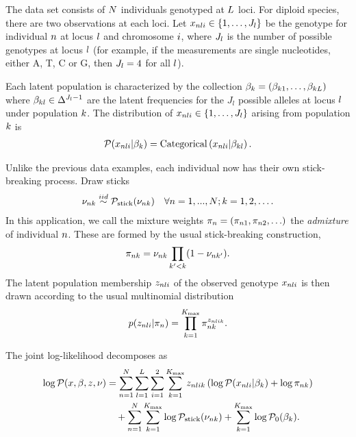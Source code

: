 \begin{ex}

The data set consists of $N$ individuals genotyped at $L$ loci.
For diploid species, there are two observations at each loci.
Let $x_{nli}\in\{1, \ldots, J_l\}$ be the genotype for individual $n$ at locus $l$ and chromosome $i$,
where $J_l$ is the number of possible genotypes at locus $l$
(for example, if the measurements are single nucleotides, either A, T, C or G,
then $J_l = 4$ for all $l$).

Each latent population is characterized by the collection
$\beta_k = (\beta_{k1}, \ldots, \beta_{kL})$ where
$\beta_{kl}\in\Delta^{J_l - 1}$ are the latent frequencies for the $J_l$
possible alleles at locus $l$ under population $k$.
The distribution of $x_{nli}\in\{1, \ldots, J_l\}$ arising from population $k$ is
\begin{align*}
\mathcal{P}(x_{nli} \vert \beta_{k}) =
\mathrm{Categorical}\left(x_{nli}\vert \beta_{kl}\right).
\end{align*}


Unlike the previous data examples, each individual now has their own stick-breaking process. Draw sticks
\begin{align*}
\nu_{nk} \overset{iid}{\sim} \mathcal{P}_{\mathrm{stick}}(\nu_{nk}) \quad \forall n = 1, ..., N; k = 1, 2, \ldots.
\end{align*}
In this application,
we call the mixture weights
$\pi_{n} = (\pi_{n1}, \pi_{n2}, \ldots)$ the
\textit{admixture} of individual $n$.
These are formed by the usual stick-breaking construction,
\begin{align*}
\pi_{nk} = \nu_{nk} \prod_{k' < k} (1 - \nu_{nk'}).
\end{align*}
%
The latent population membership $z_{nli}$ of the observed genotype
$x_{nli}$ is then drawn according to the usual multinomial distribution
\begin{align*}
p(z_{nli} | \pi_n) = \prod_{k=1}^{{K_{\mathrm{max}}}} \pi_{nk}^{z_{nlik}}.
\end{align*}

The joint log-likelihood decomposes as
\begin{align*}
\log \mathcal{P}(x, \beta, z, \nu) &=
\sum_{n=1}^N \sum_{l=1}^L \sum_{i = 1}^2 \sum_{k=1}^{{K_{\mathrm{max}}}}
        z_{nlik} \left(
            \log \mathcal{P}(x_{nli} \vert \beta_{k}) + \log \pi_{nk}
        \right)
\nonumber\\&
    \quad +
    \sum_{n=1}^N \sum_{k=1}^{{K_{\mathrm{max}}}} \log \mathcal{P}_{\mathrm{stick}}(\nu_{nk})
    + \sum_{k=1}^{{K_{\mathrm{max}}}} \log \mathcal{P}_{0}(\beta_{k}).
\end{align*}
\end{ex}

